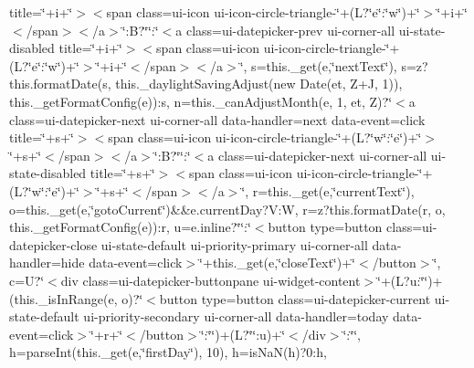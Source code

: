\begin{DoxyCompactItemize}
title=\textquotesingle{}\char`\"{}+i+\char`\"{}\textquotesingle{}$>$$<$span class=\textquotesingle{}ui-\/icon ui-\/icon-\/circle-\/triangle-\/\char`\"{}+(\+L?\char`\"{}e\char`\"{}\+:\char`\"{}w\char`\"{})+\char`\"{}\textquotesingle{}$>$\char`\"{}+i+\char`\"{}$<$/span$>$$<$/a$>$\char`\"{}\+:\+B?\char`\"{}\char`\"{}\+:\char`\"{}$<$a class=\textquotesingle{}ui-\/datepicker-\/prev ui-\/corner-\/all ui-\/state-\/disabled\textquotesingle{} title=\textquotesingle{}\char`\"{}+i+\char`\"{}\textquotesingle{}$>$$<$span class=\textquotesingle{}ui-\/icon ui-\/icon-\/circle-\/triangle-\/\char`\"{}+(\+L?\char`\"{}e\char`\"{}\+:\char`\"{}w\char`\"{})+\char`\"{}\textquotesingle{}$>$\char`\"{}+i+\char`\"{}$<$/span$>$$<$/a$>$\char`\"{}, s=this.\+\_\+get(e,\char`\"{}next\+Text\char`\"{}), s=z?this.\+format\+Date(s, this.\+\_\+daylight\+Saving\+Adjust(new Date(et, Z+\+J, 1)), this.\+\_\+get\+Format\+Config(e))\+:s, n=this.\+\_\+can\+Adjust\+Month(e, 1, et, Z)?\char`\"{}$<$a class=\textquotesingle{}ui-\/datepicker-\/next ui-\/corner-\/all\textquotesingle{} data-\/handler=\textquotesingle{}next\textquotesingle{} data-\/event=\textquotesingle{}click\textquotesingle{} title=\textquotesingle{}\char`\"{}+s+\char`\"{}\textquotesingle{}$>$$<$span class=\textquotesingle{}ui-\/icon ui-\/icon-\/circle-\/triangle-\/\char`\"{}+(\+L?\char`\"{}w\char`\"{}\+:\char`\"{}e\char`\"{})+\char`\"{}\textquotesingle{}$>$\char`\"{}+s+\char`\"{}$<$/span$>$$<$/a$>$\char`\"{}\+:\+B?\char`\"{}\char`\"{}\+:\char`\"{}$<$a class=\textquotesingle{}ui-\/datepicker-\/next ui-\/corner-\/all ui-\/state-\/disabled\textquotesingle{} title=\textquotesingle{}\char`\"{}+s+\char`\"{}\textquotesingle{}$>$$<$span class=\textquotesingle{}ui-\/icon ui-\/icon-\/circle-\/triangle-\/\char`\"{}+(\+L?\char`\"{}w\char`\"{}\+:\char`\"{}e\char`\"{})+\char`\"{}\textquotesingle{}$>$\char`\"{}+s+\char`\"{}$<$/span$>$$<$/a$>$\char`\"{}, r=this.\+\_\+get(e,\char`\"{}current\+Text\char`\"{}), o=this.\+\_\+get(e,\char`\"{}goto\+Current\char`\"{})\&\&e.\+current\+Day?\+V\+:\+W, r=z?this.\+format\+Date(r, o, this.\+\_\+get\+Format\+Config(e))\+:r, u=e.\+inline?\char`\"{}\char`\"{}\+:\char`\"{}$<$button type=\textquotesingle{}button\textquotesingle{} class=\textquotesingle{}ui-\/datepicker-\/close ui-\/state-\/default ui-\/priority-\/primary ui-\/corner-\/all\textquotesingle{} data-\/handler=\textquotesingle{}hide\textquotesingle{} data-\/event=\textquotesingle{}click\textquotesingle{}$>$\char`\"{}+this.\+\_\+get(e,\char`\"{}close\+Text\char`\"{})+\char`\"{}$<$/button$>$\char`\"{}, c=\+U?\char`\"{}$<$div class=\textquotesingle{}ui-\/datepicker-\/buttonpane ui-\/widget-\/content\textquotesingle{}$>$\char`\"{}+(\+L?u\+:\char`\"{}\char`\"{})+(this.\+\_\+is\+In\+Range(e, o)?\char`\"{}$<$button type=\textquotesingle{}button\textquotesingle{} class=\textquotesingle{}ui-\/datepicker-\/current ui-\/state-\/default ui-\/priority-\/secondary ui-\/corner-\/all\textquotesingle{} data-\/handler=\textquotesingle{}today\textquotesingle{} data-\/event=\textquotesingle{}click\textquotesingle{}$>$\char`\"{}+r+\char`\"{}$<$/button$>$\char`\"{}\+:\char`\"{}\char`\"{})+(\+L?\char`\"{}\char`\"{}\+:u)+\char`\"{}$<$/div$>$\char`\"{}\+:\char`\"{}\char`\"{}, h=parse\+Int(this.\+\_\+get(e,\char`\"{}first\+Day\char`\"{}), 10), h=is\+Na\+N(h)?0\+:h, 
\end{DoxyCompactItemize}
